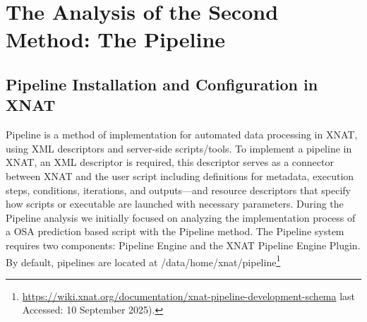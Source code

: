 \chapter{The Analysis of the Second Method: The Pipeline}
\section{Pipeline Installation and Configuration in XNAT}

Pipeline is a method of implementation for automated data processing in XNAT, using \ac{XML} descriptors and server-side scripts/tools. 
To implement a pipeline in XNAT, an XML descriptor is required, this descriptor serves as a connector between XNAT and the user script including definitions for metadata, execution steps, conditions, iterations, and outputs—and resource descriptors that specify how scripts or executable are launched with necessary parameters.
During the Pipeline analysis we initially focused on analyzing the implementation process of a OSA prediction based script with the Pipeline method. The Pipeline system requires two components: Pipeline Engine and the XNAT Pipeline Engine Plugin. By default, pipelines are located at /data/home/xnat/pipeline\footnote{\url{https://wiki.xnat.org/documentation/xnat-pipeline-development-schema} last Accessed: 10 September 2025).}   

